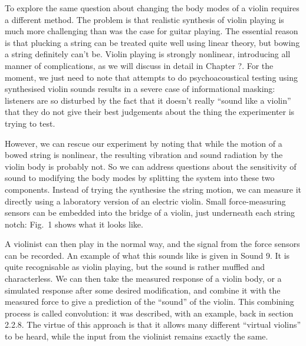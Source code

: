 

  To explore the same question about changing the body modes of a violin 
  requires a different method. The problem is that realistic synthesis of 
  violin playing is much more challenging than was the case for guitar playing. 
  The essential reason is that plucking a string can be treated quite well 
  using linear theory, but bowing a string definitely can’t be. Violin playing 
  is strongly nonlinear, introducing all manner of complications, as we will 
  discuss in detail in Chapter ?. For the moment, we just need to note that 
  attempts to do psychoacoustical testing using synthesised violin sounds 
  results in a severe case of informational masking: listeners are so disturbed 
  by the fact that it doesn’t really “sound like a violin” that they do not 
  give their best judgements about the thing the experimenter is trying to 
  test. 

  However, we can rescue our experiment by noting that while the motion of a 
  bowed string is nonlinear, the resulting vibration and sound radiation by the 
  violin body is probably not. So we can address questions about the 
  sensitivity of sound to modifying the body modes by splitting the system into 
  these two components. Instead of trying the synthesise the string motion, we 
  can measure it directly using a laboratory version of an electric violin. 
  Small force-measuring sensors can be embedded into the bridge of a violin, 
  just underneath each string notch: Fig.\ 1 shows what it looks like. 


  A violinist can then play in the normal way, and the signal from the force 
  sensors can be recorded. An example of what this sounds like is given in 
  Sound 9. It is quite recognisable as violin playing, but the sound is rather 
  muffled and characterless. We can then take the measured response of a violin 
  body, or a simulated response after some desired modification, and combine it 
  with the measured force to give a prediction of the ``sound'' of the violin. 
  This combining process is called convolution: it was described, with an 
  example, back in section 2.2.8. The virtue of this approach is that it allows 
  many different ``virtual violins'' to be heard, while the input from the 
  violinist remains exactly the same. 

